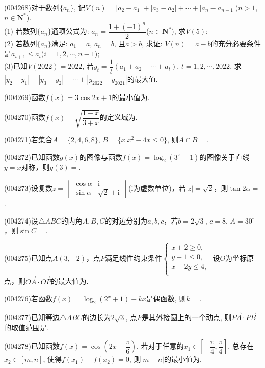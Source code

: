\item (004268)对于数列$\{a_n\}$, 记$V(n)=|a_2-a_1|+|a_3-a_2|+\cdots +|a_n-a_{n-1}|$($n>1$, $n\in \mathbf{N}^*$).\\
(1) 若数列$\{a_n\}$通项公式为: $a_n=\dfrac{1+(-1)^n}2$($n\in \mathbf{N}^*$), 求$V(5)$;\\
(2) 若数列$\{a_n\}$满足: $a_1=a$, $a_n=b$, 且$a>b$, 求证: $V(n)=a-b$的充分必要条件是$a_{i+1}\le a_i$($i=1,2,\cdots,n-1$);\\
(3)已知$V(2022)=2022$, 若$y_t=\dfrac 1t(a_1+a_2+\cdots +a_t)$, $t=1,2,\cdots,2022$, 求$|y_2-y_1|+|y_3-y_2|+\cdots +|y_{2022}-y_{2021}|$的最大值.
\item (004269)函数$f(x)=3\cos 2x+1$的最小值为.
\item (004270)函数$f(x)=\sqrt{\dfrac{1-x}{3+x}}$的定义域为.
\item (004271)若集合$A=\{2,4,6,8\}$, $B=\{x|x^2-4x\le 0\}$, 则$A\cap B=$.
\item (004272)已知函数$g(x)$的图像与函数$f(x)=\log_2(3^x-1)$的图像关于直线$y=x$对称，则$g(3)=$.
\item (004273)设复数$z=\begin{vmatrix}   \cos \alpha  & \mathrm{i}  \\
\sin \alpha  & \sqrt{2}+\mathrm{i}\end{vmatrix}$($\mathrm{i}$为虚数单位)，若$|z|=\sqrt{2}$，则$\tan 2\alpha=$.
\item (004274)设$\triangle ABC$的内角$A,B,C$的对边分别为$a,b,c$，若$b=2\sqrt{3}$, $c=8$, $A=30^\circ$，则$\sin C=$.
\item (004275)已知点$A(3,-2)$，点$P$满足线性约束条件$\begin{cases}  x+2\ge 0,  \\   y-1\le 0,  \\   x-2y\le 4,  \\ \end{cases}$ 设$O$为坐标原点，则$\overrightarrow{OA}\cdot \overrightarrow{OP}$的最大值为.
\item (004276)若函数$f(x)=\log_2(2^x+1)+kx$是偶函数, 则$k=$.
\item (004277)已知等边$\triangle ABC$的边长为$2\sqrt{3}$, 点$P$是其外接圆上的一个动点, 则$\overrightarrow{PA}\cdot \overrightarrow{PB}$的取值范围是.
\item (004278)已知函数$f(x)=\cos (2x-\dfrac \pi 6)$, 若对于任意的$x_1\in [-\dfrac \pi 4,\dfrac\pi 4]$, 总存在$x_2\in [m,n]$, 使得$f(x_1)+f(x_2)=0$, 则$|m-n|$的最小值为.
